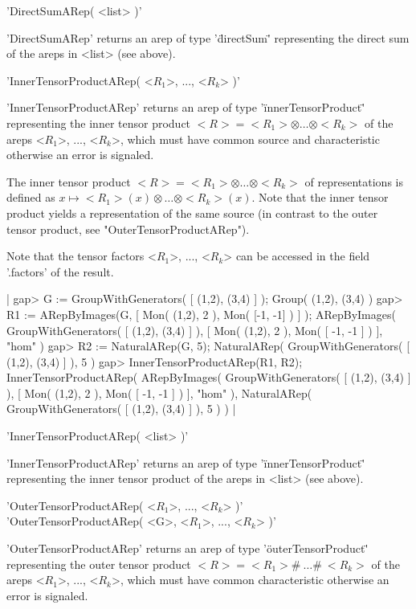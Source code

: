 'DirectSumARep( <list> )'

'DirectSumARep' returns an arep of type '\"directSum\"' representing
the direct sum of the areps in <list> (see above).

'InnerTensorProductARep( <$R_1$>, ..., <$R_k$> )'

'InnerTensorProductARep' returns an arep of type 
'\"innerTensorProduct\"' representing the inner tensor product 
$<R> = <R_1>\otimes\dots\otimes <R_k>$ of the areps <$R_1$>, ..., <$R_k$>, 
which must have common source and characteristic otherwise an error is
signaled. 

The inner tensor product $<R> = <R_1>\otimes\dots\otimes <R_k>$ 
of representations is
defined as $x\mapsto <R_1>(x)\otimes\dots\otimes <R_k>(x)$. Note 
that the inner tensor product yields a representation of the 
same source (in contrast to the outer tensor product, see 
"OuterTensorProductARep").

Note that the tensor factors <$R_1$>, ..., <$R_k$> can be accessed 
in the field '.factors' of the result.

|    gap> G := GroupWithGenerators( [ (1,2), (3,4) ] );
    Group( (1,2), (3,4) )
    gap> R1 := ARepByImages(G, [ Mon( (1,2), 2 ), Mon( [-1, -1] ) ] );
    ARepByImages(
      GroupWithGenerators( [ (1,2), (3,4) ] ),
      [ Mon( (1,2), 2 ), Mon( [ -1, -1 ] ) ],
      "hom"
    )
    gap> R2 := NaturalARep(G, 5);
    NaturalARep( GroupWithGenerators( [ (1,2), (3,4) ] ), 5 )
    gap> InnerTensorProductARep(R1, R2);
    InnerTensorProductARep(
      ARepByImages(
        GroupWithGenerators( [ (1,2), (3,4) ] ),
        [ Mon( (1,2), 2 ), Mon( [ -1, -1 ] ) ],
        "hom"
      ),
      NaturalARep( GroupWithGenerators( [ (1,2), (3,4) ] ), 5 )
    ) |

'InnerTensorProductARep( <list> )'

'InnerTensorProductARep' returns an arep of type 
'\"innerTensorProduct\"' representing
the inner tensor product of the areps in <list> (see above).

'OuterTensorProductARep( <$R_1$>, ..., <$R_k$> )'\\
'OuterTensorProductARep( <G>, <$R_1$>, ..., <$R_k$> )'

'OuterTensorProductARep' returns an arep of type 
'\"outerTensorProduct\"' representing the outer tensor product 
$<R> = <R_1>\#\ \dots\#\ <R_k>$ of the areps <$R_1$>, ..., <$R_k$>, 
which must have common characteristic otherwise an error is 
signaled. 

